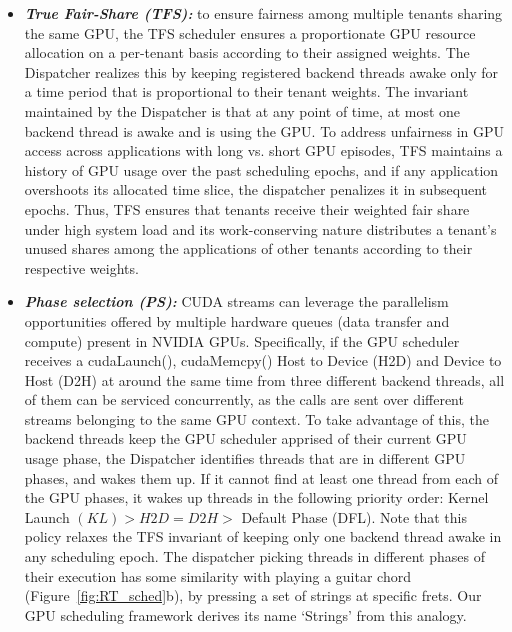 \begin{itemize}
\item \textbf{\textit{True Fair-Share (TFS): }}to ensure fairness among multiple tenants sharing the same GPU, the TFS scheduler ensures a proportionate GPU resource allocation on a per-tenant basis according to their assigned weights. The Dispatcher realizes this by keeping registered backend threads awake only for a time period that is proportional to their tenant weights.  The invariant maintained by the Dispatcher is that at any point of time, at most one backend thread is awake and is using the GPU. To  address  unfairness  in  GPU  access  across applications with long vs. short GPU episodes, TFS maintains a history of GPU usage over the past scheduling epochs, and if any application overshoots its allocated time slice, the dispatcher penalizes it in subsequent epochs. Thus, TFS ensures that tenants receive their weighted fair share under high system load and its work-conserving nature distributes a tenant’s unused shares among the applications of other tenants according to their respective weights.

\item \textbf{\textit{Phase selection (PS): }}CUDA streams can leverage the parallelism opportunities offered by multiple hardware queues (data transfer and compute) present in NVIDIA GPUs. Specifically, if the GPU scheduler receives a cudaLaunch(), cudaMemcpy() Host to Device (H2D) and Device to Host  (D2H) at around the same time from three different backend threads, all of them can be serviced concurrently, as the calls are sent over different streams belonging to the same GPU context. To take advantage of this, the backend threads keep the GPU scheduler apprised of their current GPU usage phase, the Dispatcher identifies threads that are in different GPU phases, and wakes them up. If it cannot find at least one thread from each of the GPU phases, it wakes up threads in the following priority order: Kernel Launch $(KL) > H2D = D2H > $ Default Phase (DFL). Note that this policy relaxes the TFS invariant of keeping only one backend thread awake in any scheduling epoch. The dispatcher picking threads in different phases of their execution has some similarity with playing a guitar chord (Figure~\ref{fig:RT_sched}b), by pressing a set of strings at specific frets. Our GPU scheduling framework derives its name `Strings' from this analogy.
\end{itemize}

